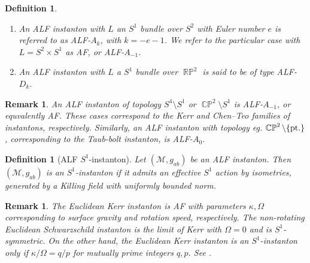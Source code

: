 \documentclass[a4paper,11pt,reqno]{amsart}
\newcommand{\cM}{\mathcal{M}}
\theoremstyle{plain}
\newtheorem{definition}[thm]{Definition}
\newtheorem{remark}[thm]{Remark}
\DeclareMathOperator{\CP}{\mathbb{C}\mathbb{P}}
\DeclareMathOperator{\RP}{\mathbb{R}\mathbb{P}}
\numberwithin{equation}{section}
\begin{document}
\begin{definition}\label{def:ALF-Ak} 
\begin{enumerate}
\item
An ALF instanton with $L$ an $S^1$ bundle over $S^2$ with Euler 
%
number $e$ is referred to as ALF-$A_k$, with $k = -e -1$. 
We refer to the particular case with $L = S^2 \times S^1$ as AF, or ALF-$A_{-1}$. 
\item An ALF instanton with $L$ a $S^1$ bundle over $\RP^2$ is said to be of type ALF-$D_k$. 
%
\end{enumerate}
\end{definition} 

\begin{remark} 
An ALF instanton of topology $S^4 \setminus S^1$ or $\CP^2\setminus S^1$ is ALF-$A_{-1}$, or equvalently AF. These cases correspond to the Kerr and Chen--Teo families of instantons, respectively. Similarly, an ALF instanton with topology eg. $\CP^2 \setminus \{\text{\rm pt.}\}$, corresponding to the Taub-bolt instanton,
is ALF-$A_0$. 
\end{remark}  


\begin{definition}[ALF $S^1$-instanton]
Let $(\cM, g_{ab})$ be an ALF instanton. Then $(\cM, g_{ab})$ is an $S^1$-instanton if it admits an effective $S^1$ action by isometries, generated by a Killing field with uniformly bounded norm.
\end{definition}

\begin{remark}
The Euclidean Kerr instanton is AF with parameters $\kappa, \Omega$ corresponding to surface gravity and rotation speed, respectively. The non-rotating Euclidean Schwarzschild instanton is the limit of Kerr with $\Omega = 0$ and is $S^1$-symmetric. On the other hand, the Euclidean Kerr instanton is an $S^1$-instanton only if $\kappa/\Omega = q/p$ for mutually prime integers $q,p$. See \cite{1998PhRvD..59b4009H}.
\end{remark}
\end{document}
